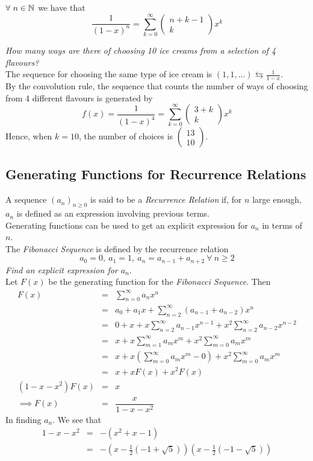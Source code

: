 \documentclass[11pt,a4paper]{article}
\begin{document}
$\forall\ n\in\mathbb{N}$ we have that
$$\frac{1}{(1-x)^n}=\sum_{k=0}^\infty\begin{pmatrix}n+k-1\\k\end{pmatrix}x^k$$

\example{}
\textit{How many ways are there of choosing 10 ice creams from a selection of 4 flavours?}\\
The sequence for choosing the same type of ice cream is $(1,1,\dots)\leftrightarrows\frac{1}{1-x}$.\\
By the convolution rule, the sequence that counts the number of ways of choosing from 4 different flavours is generated by
$$f(x)=\frac{1}{(1-x)^4}=\sum_{k=0}^\infty\begin{pmatrix}3+k\\k\end{pmatrix}x^k$$
Hence, when $k=10$, the number of choices is $\begin{pmatrix}13\\10\end{pmatrix}$.

\subsection{Generating Functions for Recurrence Relations}

A sequence $(a_n)_{n\geq0}$ is said to be a \textit{Recurrence Relation} if, for $n$ large enough, $a_n$ is defined as an expression involving previous terms.\\
\nb Generating functions can be used to get an explicit expression for $a_n$ in terms of $n$.\\

The \textit{Fibonacci Sequence} is defined by the recurrence relation
$$a_0=0,\ a_1=1,\ a_n=a_{n-1}+a_{n+2}\ \forall\ n\geq 2$$
\textit{Find an explicit expression for $a_n$}.\\

Let $F(x)$ be the generating function for the \textit{Fibonacci Sequence}. Then
\[\begin{array}{rcl}
F(x)&=&\sum_{n=0}^\infty a_nx^n\\
&=&a_0+a_1x+\sum_{n=2}^\infty (a_{n-1}+a_{n-2})x^n\\
&=&0+x+x\sum_{n=2}^\infty a_{n-1}x^{n-1}+x^2\sum_{n=2}^\infty a_{n-2}x^{n-2}\\
&=&x+x\sum_{m=1}^\infty a_mx^m+x^2\sum_{m=0}^\infty a_mx^m\\
&=&x+x\left(\sum_{m=0}^\infty a_mx^m-0\right)+x^2\sum_{m=0}^\infty a_mx^m\\
&=&x+xF(x)+x^2F(x)\\
(1-x-x^2)F(x)&=&x\\
\implies F(x)&=&\dfrac{x}{1-x-x^2}
\end{array}\]
In finding $a_n$. We see that
\[\begin{array}{rcl}
1-x-x^2&=&-(x^2+x-1)\\
&=&-(x-\frac{1}{2}(-1+\sqrt{5}))(x-\frac{1}{2}(-1-\sqrt{5}))
\end{array}\]
\end{document}
